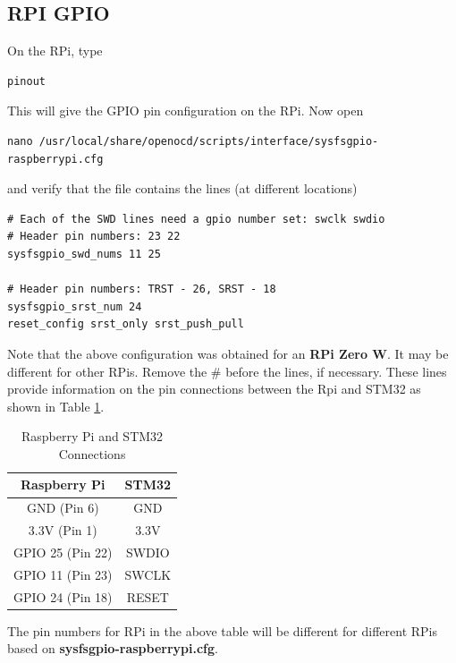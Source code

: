 \documentclass[journal,12pt,twocolumn]{IEEEtran}
\begin{document}
\subsection{RPI  GPIO}
On the RPi, type
\begin{lstlisting}
pinout
\end{lstlisting}
%
This will give the GPIO pin configuration on the RPi. Now open
\begin{lstlisting}
nano /usr/local/share/openocd/scripts/interface/sysfsgpio-raspberrypi.cfg
\end{lstlisting}
%
and verify that the file contains the lines (at different locations)
\begin{lstlisting}
# Each of the SWD lines need a gpio number set: swclk swdio
# Header pin numbers: 23 22
sysfsgpio_swd_nums 11 25

# Header pin numbers: TRST - 26, SRST - 18
sysfsgpio_srst_num 24
reset_config srst_only srst_push_pull
\end{lstlisting}
%
Note that the above configuration was obtained for an \textbf{RPi Zero W}. It may be different for other RPis.  Remove the \# before the  lines, if necessary.  These lines provide information on the pin connections between the Rpi and STM32 as shown in Table \ref{table:raspstm}.
\begin{table}[!h]
\centering
\begin{tabular}{|c|c|}
\hline
\textbf{Raspberry Pi} & \textbf{STM32} \\ \hline
GND (Pin 6)           & GND            \\ \hline
3.3V (Pin 1)          & 3.3V           \\ \hline
GPIO 25 (Pin 22)               & SWDIO           \\ \hline
GPIO 11 (Pin 23)               & SWCLK           \\ \hline
GPIO 24 (Pin 18)               & RESET          \\ \hline
\end{tabular}%
%
\caption{Raspberry Pi and STM32 Connections}
\label{table:raspstm}
\end{table}
The pin numbers for RPi in the above table will be different for different RPis based on \textbf{sysfsgpio-raspberrypi.cfg}.
\end{document}
